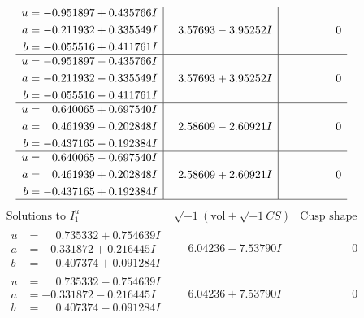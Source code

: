 \documentclass[1p]{elsarticle_modified}
\theoremstyle{definition}
\newcommand{\I}{\sqrt{-1}}
\begin{document}
$$\begin{array}{c|c|c}
\begin{aligned}
u &= -0.951897 + 0.435766 I \\
a &= -0.211932 + 0.335549 I \\
b &= -0.055516 + 0.411761 I\end{aligned}
 & \phantom{-}3.57693 - 3.95252 I & \phantom{-0.000000 } 0 \\ \hline\begin{aligned}
u &= -0.951897 - 0.435766 I \\
a &= -0.211932 - 0.335549 I \\
b &= -0.055516 - 0.411761 I\end{aligned}
 & \phantom{-}3.57693 + 3.95252 I & \phantom{-0.000000 } 0 \\ \hline\begin{aligned}
u &= \phantom{-}0.640065 + 0.697540 I \\
a &= \phantom{-}0.461939 - 0.202848 I \\
b &= -0.437165 - 0.192384 I\end{aligned}
 & \phantom{-}2.58609 - 2.60921 I & \phantom{-0.000000 } 0 \\ \hline\begin{aligned}
u &= \phantom{-}0.640065 - 0.697540 I \\
a &= \phantom{-}0.461939 + 0.202848 I \\
b &= -0.437165 + 0.192384 I\end{aligned}
 & \phantom{-}2.58609 + 2.60921 I & \phantom{-0.000000 } 0\\
 \hline 
 \end{array}$$\newpage$$\begin{array}{c|c|c}  
\text{Solutions to }I^u_{1}& \I (\text{vol} + \sqrt{-1}CS) & \text{Cusp shape}\\
 \hline 
\begin{aligned}
u &= \phantom{-}0.735332 + 0.754639 I \\
a &= -0.331872 + 0.216445 I \\
b &= \phantom{-}0.407374 + 0.091284 I\end{aligned}
 & \phantom{-}6.04236 - 7.53790 I & \phantom{-0.000000 } 0 \\ \hline\begin{aligned}
u &= \phantom{-}0.735332 - 0.754639 I \\
a &= -0.331872 - 0.216445 I \\
b &= \phantom{-}0.407374 - 0.091284 I\end{aligned}
 & \phantom{-}6.04236 + 7.53790 I & \phantom{-0.000000 } 0 \\ \hline\begin{aligned}

\end{aligned}
\end{array}$$
\end{document}
